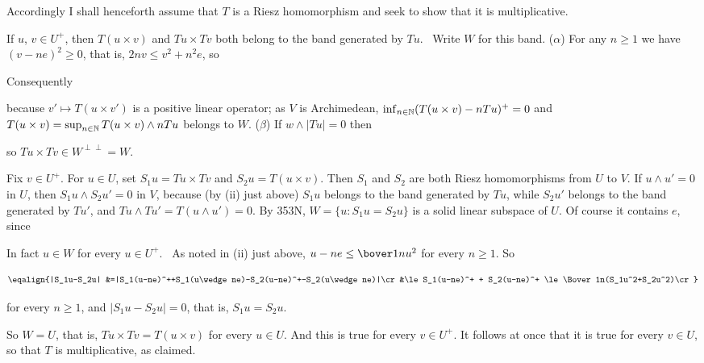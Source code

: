 { Accordingly I shall henceforth assume that $T$ is a
Riesz homomorphism and seek to show that it is multiplicative.
     
If $u$, $v\in U^+$, then $T(u\times v)$ and $Tu\times Tv$ both belong to
the band generated by $Tu$.
\Prf\ Write $W$ for this band.   ($\alpha$) For any $n\ge 1$ we have
$(v-ne)^2\ge 0$, that is, $2nv\le v^2+n^2e$, so
     
     
\noindent Consequently
     
     
\noindent because $v'\mapsto T(u\times v')$ is a positive linear
operator;  as $V$ is Archimedean,
$\inf_{n\in\Bbb N}(T(u\times v)-nTu)^+=0$ and $T(u\times
v)=\sup_{n\in\Bbb N}T(u\times v)\wedge nTu$ belongs to $W$.
($\beta$) If $w\wedge|Tu|=0$ then
     
     
\noindent so $Tu\times Tv\in W^{\perp\perp}=W$.\ \Qed
     
\medskip
     
 Fix
$v\in U^+$.   For $u\in U$, set $S_1u=Tu\times Tv$ and $S_2u=T(u\times
v)$.   Then $S_1$ and $S_2$ are both Riesz homomorphisms from $U$ to
$V$.   If $u\wedge u'=0$ in $U$, then $S_1u\wedge S_2u'=0$ in $V$,
because (by (ii) just above) $S_1u$ belongs to the band generated by
$Tu$, while $S_2u'$ belongs to the band generated by $Tu'$, and
$Tu\wedge Tu'=T(u\wedge u')=0$.   By 353N, $W=\{u:S_1u=S_2u\}$ is a
solid linear subspace of $U$.   Of course it contains $e$, since
     
     
\noindent In fact $u\in W$ for every $u\in U^+$.   \Prf\ As noted in
(ii) just above,
$u-ne\le\bover1nu^2$ for every $n\ge 1$.   So
     
$$\eqalign{|S_1u-S_2u|
&=|S_1(u-ne)^++S_1(u\wedge ne)-S_2(u-ne)^+-S_2(u\wedge ne)|\cr
&\le S_1(u-ne)^+ + S_2(u-ne)^+
\le\Bover1n(S_1u^2+S_2u^2)\cr}$$
     
\noindent for every $n\ge 1$, and $|S_1u-S_2u|=0$, that is,
$S_1u=S_2u$.\ \Qed
     
So $W=U$, that is, $Tu\times Tv=T(u\times v)$ for every $u\in U$.  And
this is true for every $v\in U^+$.   It follows at once that it is true
for every $v\in U$, so that $T$ is multiplicative, as claimed.
}%

